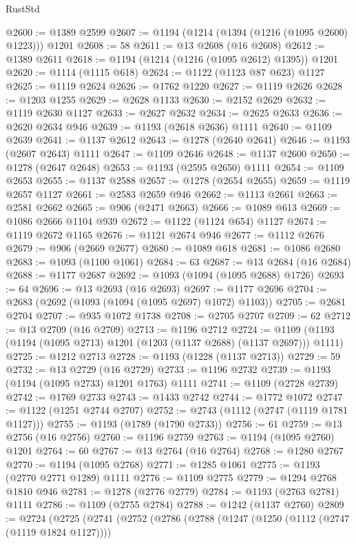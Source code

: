 \begin{lexlean}{RustStd}
\begin{coremodule}
@2600 := @1389 @2599
@2607 := @1194 (@1214 (@1394 (@1216 (@1095 @2600) @1223))) @1201
@2608 := 58
@2611 := @13 @2608 (@16 @2608)
@2612 := @1389 @2611
@2618 := @1194 (@1214 (@1216 (@1095 @2612) @1395)) @1201
@2620 := @1114 (@1115 @618)
@2624 := @1122 (@1123 @87 @623) @1127
@2625 := @1119 @2624
@2626 := @1762 @1220
@2627 := @1119 @2626
@2628 := @1203 @1255
@2629 := @2628 @1133
@2630 := @2152 @2629
@2632 := @1119 @2630 @1127
@2633 := @2627 @2632
@2634 := @2625 @2633
@2636 := @2620 @2634 @946
@2639 := @1193 (@2618 @2636) @1111
@2640 := @1109 @2639
@2641 := @1137 @2612
@2643 := @1278 (@2640 @2641)
@2646 := @1193 (@2607 @2643) @1111
@2647 := @1109 @2646
@2648 := @1137 @2600
@2650 := @1278 (@2647 @2648)
@2653 := @1193 (@2595 @2650) @1111
@2654 := @1109 @2653
@2655 := @1137 @2588
@2657 := @1278 (@2654 @2655)
@2659 := @1119 @2657 @1127
@2661 := @2583 @2659 @946
@2662 := @1113 @2661
@2663 := @2581 @2662
@2665 := @906 (@2471 @2663)
@2666 := @1089 @613
@2669 := @1086 @2666 @1104 @939
@2672 := @1122 (@1124 @654) @1127
@2674 := @1119 @2672 @1165
@2676 := @1121 @2674 @946
@2677 := @1112 @2676
@2679 := @906 (@2669 @2677)
@2680 := @1089 @618
@2681 := @1086 @2680
@2683 := @1093 (@1100 @1061)
@2684 := 63
@2687 := @13 @2684 (@16 @2684)
@2688 := @1177 @2687
@2692 := @1093 (@1094 (@1095 @2688) @1726)
@2693 := 64
@2696 := @13 @2693 (@16 @2693)
@2697 := @1177 @2696
@2704 := @2683 (@2692 (@1093 (@1094 (@1095 @2697) @1072) @1103))
@2705 := @2681 @2704
@2707 := @935 @1072 @1738
@2708 := @2705 @2707
@2709 := 62
@2712 := @13 @2709 (@16 @2709)
@2713 := @1196 @2712
@2724 := @1109 (@1193 (@1194 (@1095 @2713) @1201 (@1203 (@1137 @2688) (@1137 @2697))) @1111)
@2725 := @1212 @2713
@2728 := @1193 (@1228 (@1137 @2713))
@2729 := 59
@2732 := @13 @2729 (@16 @2729)
@2733 := @1196 @2732
@2739 := @1193 (@1194 (@1095 @2733) @1201 @1763) @1111
@2741 := @1109 (@2728 @2739)
@2742 := @1769 @2733
@2743 := @1433 @2742
@2744 := @1772 @1072
@2747 := @1122 (@1251 @2744 @2707)
@2752 := @2743 (@1112 (@2747 (@1119 @1781 @1127)))
@2755 := @1193 (@1789 (@1790 @2733))
@2756 := 61
@2759 := @13 @2756 (@16 @2756)
@2760 := @1196 @2759
@2763 := @1194 (@1095 @2760) @1201
@2764 := 60
@2767 := @13 @2764 (@16 @2764)
@2768 := @1280 @2767
@2770 := @1194 (@1095 @2768)
@2771 := @1285 @1061
@2775 := @1193 (@2770 @2771 @1289) @1111
@2776 := @1109 @2775
@2779 := @1294 @2768 @1810 @946
@2781 := @1278 (@2776 @2779)
@2784 := @1193 (@2763 @2781) @1111
@2786 := @1109 (@2755 @2784)
@2788 := @1242 (@1137 @2760)
@2809 := @2724
    (@2725
      (@2741
        (@2752
          (@2786
            (@2788
              (@1247
                (@1250 (@1112 (@2747 (@1119 @1824 @1127))))

\end{coremodule}
\end{lexlean}
